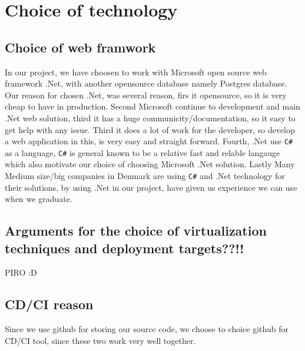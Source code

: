 
\section{Choice of technology}

\subsection{Choice of web framwork}
In our project, we have choosen to work with Microsoft open source web framework .Net, with another opensource database namely Postgres database. Our reason for chosen .Net, was several reason, firs it opensource, so it is very cheap to have in production. Second Microsoft continue to development and main .Net web solution, third it has a huge communicity/documentation, so it easy to get help with any issue. Third it does a lot of work for the developer, so develop a web application in this, is very easy and straight forward. Fourth, .Net use \texttt{C\#} as a language, \texttt{C\#} is general known to be a relative fast and relable langauge which also motivate our choice of choosing Microsoft .Net solution. Lastly Many Medium size/big companies in Denmark are using \texttt{C\#} and .Net technology for their solutions, by using .Net in our project, have given us experience we can use when we graduate. 


\subsection{Arguments for the choice of virtualization techniques and deployment targets??!!}
PIRO :D 

\subsection{CD/CI reason}
Since we use github for storing our source code, we choose to choice github for CD/CI tool, since these two work very well together. 





